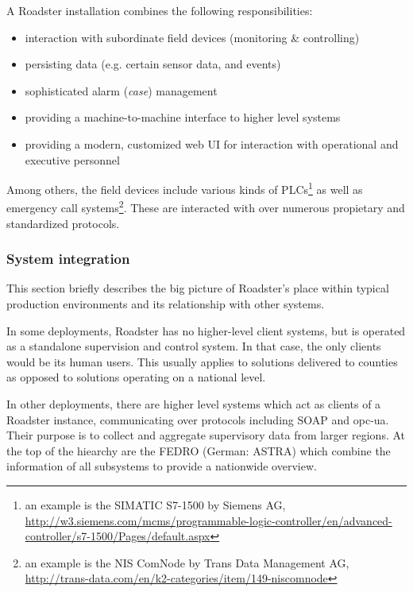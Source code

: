 A Roadster installation combines the following responsibilities:

\begin{itemize}
	\item interaction with subordinate field devices (monitoring \& controlling)
	\item persisting data (e.g. certain sensor data, and events)
	\item sophisticated alarm (\emph{case}) management
	\item providing a machine-to-machine interface to higher level systems
	\item providing a modern, customized web UI for interaction with operational and executive personnel
\end{itemize}

Among others, the field devices include various kinds of \glspl{PLC}\footnote{an example
is the SIMATIC S7-1500 by Siemens AG,
\url{http://w3.siemens.com/mcms/programmable-logic-controller/en/advanced-controller/s7-1500/Pages/default.aspx}}
as well as emergency call systems\footnote{an example is the NIS ComNode by Trans Data
Management AG,
\url{http://trans-data.com/en/k2-categories/item/149-niscomnode}}.
These are interacted with over numerous propietary and standardized protocols.

\subsubsection{System integration}
This section briefly describes the big picture of Roadster's place within
typical production environments and its relationship with other systems.

In some deployments, Roadster has no higher-level client systems, but is
operated as a standalone supervision and control system. In that case, the only
clients would be its human users. This usually applies to solutions delivered
to counties as opposed to solutions operating on a national level.

In other deployments, there are higher level systems which act as clients of a Roadster instance, communicating over
protocols including \gls{SOAP} and \gls{opc-ua}. Their purpose is to
collect and aggregate supervisory data from larger regions. At the top of the
hiearchy are the \gls{FEDRO} (German: \gls{ASTRA}) which combine the information of all
subsystems to provide a nationwide overview.

